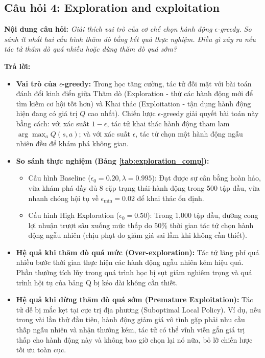 \documentclass[12pt,a4paper]{article}
\begin{document}
\subsection{Câu hỏi 4: Exploration and exploitation}
\textbf{Nội dung câu hỏi:} \textit{Giải thích vai trò của cơ chế chọn hành động $\epsilon$-greedy. So sánh ít nhất hai cấu hình thăm dò bằng kết quả thực nghiệm. Điều gì xảy ra nếu tác tử thăm dò quá nhiều hoặc dừng thăm dò quá sớm?}

\textbf{Trả lời:}
\begin{itemize}
    \item \textbf{Vai trò của $\epsilon$-greedy:} Trong học tăng cường, tác tử đối mặt với bài toán đánh đổi kinh điển giữa Thăm dò (Exploration - thử các hành động mới để tìm kiếm cơ hội tốt hơn) và Khai thác (Exploitation - tận dụng hành động hiện đang có giá trị $Q$ cao nhất). Chiến lược $\epsilon$-greedy giải quyết bài toán này bằng cách: với xác suất $1 - \epsilon$, tác tử khai thác hành động tham lam $\arg\max_a Q(s, a)$; và với xác suất $\epsilon$, tác tử chọn một hành động ngẫu nhiên đều để khám phá không gian.
    \item \textbf{So sánh thực nghiệm (Bảng \ref{tab:exploration_comp}):}
    \begin{itemize}
        \item Cấu hình Baseline ($\epsilon_0=0.20, \lambda=0.995$): Đạt được sự cân bằng hoàn hảo, vừa khám phá đầy đủ 8 cặp trạng thái-hành động trong 500 tập đầu, vừa nhanh chóng hội tụ về $\epsilon_{\min}=0.02$ để khai thác ổn định.
        \item Cấu hình High Exploration ($\epsilon_0=0.50$): Trong 1,000 tập đầu, đường cong lợi nhuận trượt sâu xuống mức thấp do $50\%$ thời gian tác tử chọn hành động ngẫu nhiên (chịu phạt do giảm giá sai lầm khi không cần thiết).
    \end{itemize}
    \item \textbf{Hệ quả khi thăm dò quá mức (Over-exploration):} Tác tử lãng phí quá nhiều bước thời gian thực hiện các hành động ngẫu nhiên kém hiệu quả. Phần thưởng tích lũy trong quá trình học bị sụt giảm nghiêm trọng và quá trình hội tụ của bảng Q bị kéo dài không cần thiết.
    \item \textbf{Hệ quả khi dừng thăm dò quá sớm (Premature Exploitation):} Tác tử dễ bị mắc kẹt tại cực trị địa phương (Suboptimal Local Policy). Ví dụ, nếu trong vài lần thử đầu tiên, hành động giảm giá vô tình gặp phải nhu cầu thấp ngẫu nhiên và nhận thưởng kém, tác tử có thể vĩnh viễn gắn giá trị thấp cho hành động này và không bao giờ chọn lại nó nữa, bỏ lỡ chiến lược tối ưu toàn cục.
\end{itemize}
\end{document}
